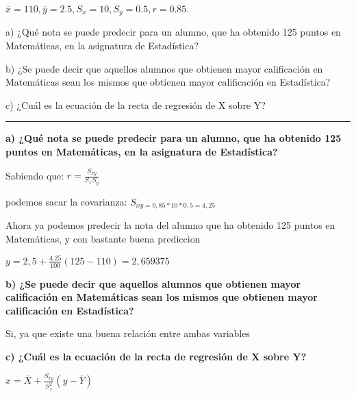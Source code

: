\documentclass{article}
\begin{document}
\(\overline{x} = 110, \overline{y} = 2.5, S_{x} = 10, S_{y} = 0.5, r = 0.85.\)

a) ¿Qu\'e nota se puede predecir para un alumno, que ha obtenido 125 puntos en Matem\'aticas, en la asignatura de Estad\'istica?

b) ¿Se puede decir que aquellos alumnos que obtienen mayor calificaci\'on en Matem\'aticas sean los mismos que obtienen mayor calificaci\'on en Estad\'istica?

c) ¿Cu\'al es la ecuaci\'on de la recta de regresi\'on de X sobre Y?

\rule{119mm}{0.2mm}

\textbf{a) ¿Qu\'e nota se puede predecir para un alumno, que ha obtenido 125 puntos en Matem\'aticas, en la asignatura de Estad\'istica?}

Sabiendo que: \(r = \frac{S_{xy}}{S_{x} S_{y}} \)

podemos sacar la covarianza: \(S_{xy = 0,85 * 10 * 0,5 = 4,25} \)

Ahora ya podemos predecir la nota del alumno que ha obtenido 125 puntos en Matem\'aticas, y con bastante buena prediccion

\(y = 2,5 + \frac{4.25}{100} (125 - 110) = 2,659375\)

\textbf{b) ¿Se puede decir que aquellos alumnos que obtienen mayor calificaci\'on en Matem\'aticas sean los mismos que obtienen mayor calificaci\'on en Estad\'istica?}

Si, ya que existe una buena relaci\'on entre ambas variables

\textbf{c) ¿Cu\'al es la ecuaci\'on de la recta de regresi\'on de X sobre Y?}

\(x = \overline{X} + \frac{S_{xy}}{S_{x}^2} (y - \overline{Y})\)
\end{document}
